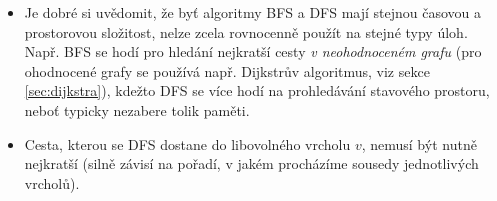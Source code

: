 \begin{remark}
    \begin{itemize}
        \item Je dobré si uvědomit, že byť algoritmy BFS a DFS mají stejnou časovou a prostorovou složitost, nelze zcela rovnocenně použít na stejné typy úloh. Např. BFS se hodí pro hledání nejkratší cesty \emph{v neohodnoceném grafu} (pro ohodnocené grafy se používá např. Dijkstrův algoritmus, viz sekce \ref{sec:dijkstra}), kdežto DFS se více hodí na prohledávání stavového prostoru, neboť typicky nezabere tolik paměti.
        \item Cesta, kterou se DFS dostane do libovolného vrcholu $v$, nemusí být nutně nejkratší (silně závisí na pořadí, v jakém procházíme sousedy jednotlivých vrcholů). 
    \end{itemize}
\end{remark}
